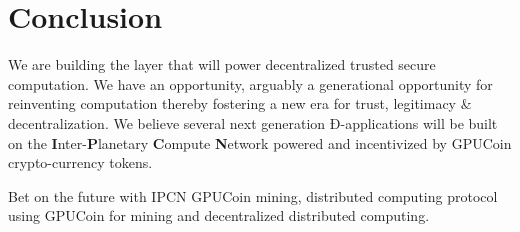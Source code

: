 \documentclass{article}
\begin{document}
\section{Conclusion}
We are building the layer that will power decentralized trusted secure computation. We have an opportunity, arguably a generational opportunity for reinventing computation thereby fostering a new era for trust, legitimacy \& decentralization. We believe several next generation Ð-applications will be built on the \textbf{I}nter-\textbf{P}lanetary \textbf{C}ompute \textbf{N}etwork powered and incentivized by GPUCoin crypto-currency tokens.


Bet on the future with IPCN GPUCoin mining, distributed computing protocol using GPUCoin for mining and decentralized distributed computing.





\newpage
\listoffigures
\newpage 
\listoftables
\newpage 

\end{document}
